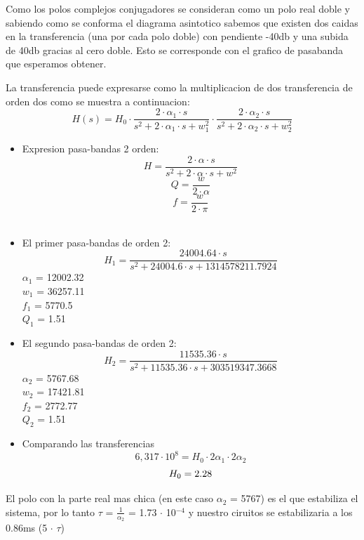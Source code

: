 \documentclass[11pt]{diazessay} %
\begin{document}
Como los polos complejos conjugadores se consideran como un polo real doble y sabiendo como se conforma el diagrama asintotico sabemos que existen
dos caidas en la transferencia (una por cada polo doble) con pendiente -40db y una subida de 40db gracias al cero doble. Esto se corresponde con el
grafico de pasabanda que esperamos obtener.

La transferencia puede expresarse como la multiplicacion de dos transferencia de orden dos como se muestra a continuacion:
\begin{equation}
H(s) = H_{0} \cdot \frac{ 2 \cdot \alpha_{1} \cdot s }{ s^2 + 2 \cdot \alpha_{1} \cdot s + w_{1}^2} \cdot \frac{ 2 \cdot \alpha_{2} \cdot s }{ s^2 + 2 \cdot \alpha_{2} \cdot s + w_{2}^2}
\end{equation}
\begin{itemize}
\item Expresion pasa-bandas 2 orden:
\begin{equation}
H = \frac{ 2 \cdot \alpha \cdot s }{ s^2 + 2 \cdot \alpha \cdot s + w^2}
\end{equation}
\begin{equation}
Q = \frac{w}{2 \cdot \alpha}
\end{equation}
\begin{equation}
f = \frac{w}{2 \cdot \pi}
\end{equation}\\
\item El primer pasa-bandas de orden 2:
\begin{equation}
H_{1} = \frac{24004.64 \cdot s}{s^2 + 24004.6 \cdot s + 1314578211.7924} 
\end{equation}
$\alpha_{1}$ = 12002.32\\
$w_{1}$ = 36257.11\\
$f_{1}$ = 5770.5\\
$Q_{1}$ = 1.51\\
\item El segundo pasa-bandas de orden 2:
\begin{equation}
H_{2} = \frac{11535.36 \cdot s}{s^2 +11535.36 \cdot s + 303519347.3668} 
\end{equation}
$\alpha_{2}$ = 5767.68\\
$w_{2}$ = 17421.81\\
$f_{2}$ = 2772.77\\
$Q_{2}$ = 1.51\\
\item Comparando las transferencias
\begin{equation}
6,317 \cdot 10^8 = H_{0} \cdot 2\alpha_{1} \cdot 2\alpha_{2}
\end{equation}
\begin{equation}
H_{0} = 2.28\\
\end{equation}
\end{itemize}
El polo con la parte real mas chica (en este caso $\alpha_{2}$ = 5767) es el que estabiliza el sistema, por lo tanto $\tau$ = $\frac{1}{\alpha_{2}}$ = 1.73 $\cdot$ 10$^{-4}$ y nuestro ciruitos se estabilizaria a los 0.86ms (5 $\cdot$ $\tau$)\\
\end{document}
